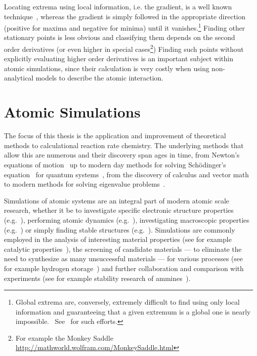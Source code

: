 Locating extrema using local information, i.e. the gradient, is a well known technique~\cite{cg-original-1952}, whereas the gradient is simply followed in the appropriate direction (positive for maxima and negative for minima) until it vanishes.\footnote{Global extrema are, conversely, extremely difficult to find using only local information and guaranteeing that a given extremum is a global one is nearly impossible.~\cite{Stillinger1999} See~\cite{Wang2010, Wales1999, Pickard2011, Oganov2008, Kirkpatrick1983, Johnston2003, Fischer2006} for such efforts.}
Finding other stationary points is less obvious and classifying them depends on the second order derivatives (or even higher in special cases\footnote{For example the Monkey Saddle \url{http://mathworld.wolfram.com/MonkeySaddle.html}})
Finding such points without explicitly evaluating higher order derivatives is an important subject within atomic simulations, since their calculation is very costly when using non-analytical models to describe the atomic interaction.

\section{Atomic Simulations}
The focus of this thesis is the application and improvement of theoretical methods to calculational reaction rate chemistry.
The underlying methods that allow this are numerous and their discovery span ages in time, from Newton's equations of motion~\cite{newton-latin} up to modern day methods for solving Sch\"odinger's equation~\cite{schrodinger-equation-1926} for quantum systems~\cite{hohenberg-kohn-1964, gpaw-review-2010, dacapo-1999}, from the discovery of calculus and vector math to modern methods for solving eigenvalue problems~\cite{eigenvalue-problems-2000}.

Simulations of atomic systems are an integral part of modern atomic scale research, whether it be to investigate specific electronic structure properties (e.g.~\cite{electronic-study}), performing atomic dynamics (e.g.~\cite{dynamics-review-2002}), investigating macroscopic properties (e.g.~\cite{macroscopic}) or simply finding stable structures (e.g.~\cite{summer-school-paper-2009}).
Simulations are commonly employed in the analysis of interesting material properties (see for example catalytic properties~\cite{catalytic}), the screening of candidate materials --- to eliminate the need to synthesize as many unsuccessful materials --- for various processes (see for example hydrogen storage~\cite{summer-school-paper-2009}) and further collaboration and comparison with experiments (see for example stability research of ammines~\cite{order-disorder-2010}).

